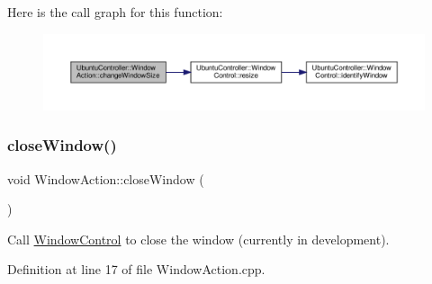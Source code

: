 Here is the call graph for this function\+:
\nopagebreak
\begin{figure}[H]
\begin{center}
\leavevmode
\includegraphics[width=350pt]{class_ubuntu_controller_1_1_window_action_ac7145d79c3b902a716d554d09e6e2a63_cgraph}
\end{center}
\end{figure}
\mbox{\label{class_ubuntu_controller_1_1_window_action_a99150ce49f2956c56e64b6ba0246424f}} 
\subsubsection{\texorpdfstring{close\+Window()}{closeWindow()}}
{\footnotesize\ttfamily void Window\+Action\+::close\+Window (\begin{DoxyParamCaption}{ }\end{DoxyParamCaption})}

Call \hyperlink{class_ubuntu_controller_1_1_window_control}{Window\+Control} to close the window (currently in development). 

Definition at line 17 of file Window\+Action.\+cpp.

